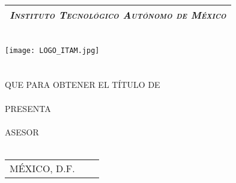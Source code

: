 \thispagestyle{empty}
\begin{titlepage}

	\begin{center}
	\vspace{70pt}
		\begin{tabular}{c}
			\Large \emph{\textsc{Instituto Tecnológico Autónomo de México}}\\
			\hline
		\end{tabular}\\
		\vspace{25pt}
		\texttt{[image: LOGO\_ITAM.jpg]}\\
		\vspace{25pt}
		{\huge \thetitle}\\
		\vspace{5pt}
		\vspace{20 pt}
		{\Large \thethesis } \\
		\vspace{5pt}
		QUE PARA OBTENER EL TÍTULO DE \\
		\vspace{5pt}
		{\Large \thedegree} \\
		\vspace{5pt}
		PRESENTA \\
		\vspace{5pt}
		{\Large \theauthor} \\
		\vfill
		ASESOR \\
		{\Large \theadvisor} \\
		\vspace{5pt}
		\begin{tabular}{lcr}
			MÉXICO, D.F. & \hspace{60pt} & \theyear
		\end{tabular}
	\end{center}
\end{titlepage}
